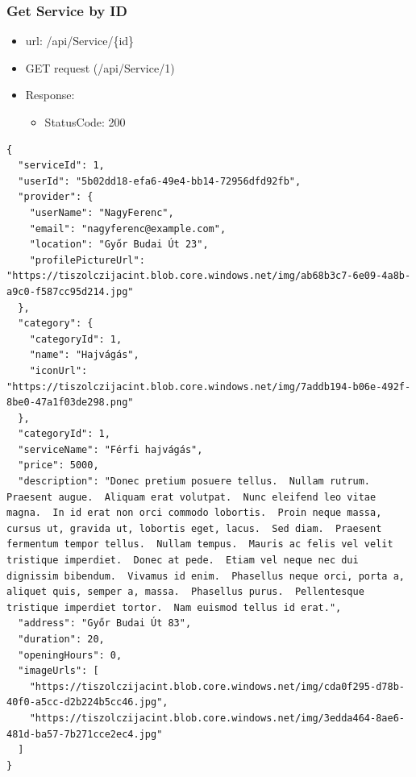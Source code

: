 \documentclass[11pt]{article}
\begin{document}
\subsubsection{Get Service by ID}
\label{sec:orgb10d4f2}
\begin{itemize}
\item url: /api/Service/\{id\}
\item GET request (/api/Service/1)
\item Response:
\begin{itemize}
\item StatusCode: 200
\end{itemize}
\end{itemize}
\begin{verbatim}
{
  "serviceId": 1,
  "userId": "5b02dd18-efa6-49e4-bb14-72956dfd92fb",
  "provider": {
    "userName": "NagyFerenc",
    "email": "nagyferenc@example.com",
    "location": "Győr Budai Út 23",
    "profilePictureUrl": "https://tiszolczijacint.blob.core.windows.net/img/ab68b3c7-6e09-4a8b-a9c0-f587cc95d214.jpg"
  },
  "category": {
    "categoryId": 1,
    "name": "Hajvágás",
    "iconUrl": "https://tiszolczijacint.blob.core.windows.net/img/7addb194-b06e-492f-8be0-47a1f03de298.png"
  },
  "categoryId": 1,
  "serviceName": "Férfi hajvágás",
  "price": 5000,
  "description": "Donec pretium posuere tellus.  Nullam rutrum.  Praesent augue.  Aliquam erat volutpat.  Nunc eleifend leo vitae magna.  In id erat non orci commodo lobortis.  Proin neque massa, cursus ut, gravida ut, lobortis eget, lacus.  Sed diam.  Praesent fermentum tempor tellus.  Nullam tempus.  Mauris ac felis vel velit tristique imperdiet.  Donec at pede.  Etiam vel neque nec dui dignissim bibendum.  Vivamus id enim.  Phasellus neque orci, porta a, aliquet quis, semper a, massa.  Phasellus purus.  Pellentesque tristique imperdiet tortor.  Nam euismod tellus id erat.",
  "address": "Győr Budai Út 83",
  "duration": 20,
  "openingHours": 0,
  "imageUrls": [
    "https://tiszolczijacint.blob.core.windows.net/img/cda0f295-d78b-40f0-a5cc-d2b224b5cc46.jpg",
    "https://tiszolczijacint.blob.core.windows.net/img/3edda464-8ae6-481d-ba57-7b271cce2ec4.jpg"
  ]
}
\end{verbatim}
\end{document}
